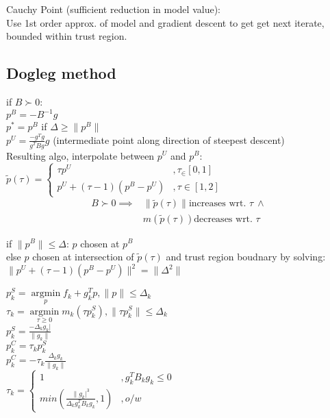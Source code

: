 \documentclass[8pt,letter]{article}
\DeclareMathOperator*{\argmin}{argmin}
\newcommand*{\argminl}{\argmin\limits}
\begin{document}
\begin{multicols*}{2}
  Cauchy Point (sufficient reduction in model value):\\
  Use 1st order approx. of model and gradient descent to get get next iterate, bounded within trust region.\\
  
  \subsection{Dogleg method}
  if $B \succ 0$:\\
  $p^B=-B^{-1}g$\\
  $p^*=p^B$ if $\Delta \geq \|p^B\|$\\
  $p^U=\frac{-g^Tg}{g^TBg}g$ (intermediate point along direction of steepest descent)\\
  Resulting algo, interpolate between $p^U$ and $p^B$:\\
  $\tilde{p}(\tau) =
  \begin{cases}
    \tau p^U &, \tau_\in [0,1]\\
    p^U + (\tau-1)(p^B-p^U) &, \tau \in [1,2]
  \end{cases}
  $
  \begin{align*}
    B \succ 0 \implies & \|\tilde{p}(\tau)\| \text{increases wrt. }\tau\ \land\\
    & m(\tilde{p}(\tau)) \text{decreases wrt. } \tau
  \end{align*}
  
  if $\|p^B\| \leq \Delta$: $p$ chosen at $p^B$\\
  else $p$ chosen at intersection of $\tilde{p}(\tau)$ and trust region boudnary by solving:\\
  $\|p^U+(\tau-1)(p^B-p^U)\|^2 = \|\Delta^2\|$

  $p_k^S=\argminl_p f_k+g_k^Tp, \|p\| \leq \Delta_k$\\
  $\tau_k = \argminl_{\tau\geq0} m_k(\tau p_k^S), \|\tau p_k^S\| \leq \Delta_k$\\
  $p_k^S=\frac{-\Delta_k g_k|}{\|g_k\|}$\\
  $p_k^C=\tau_k p_k^S$\\
  $p_k^C=-\tau_k \frac{\Delta_k g_k}{\|g_k\|}$\\
  $\tau_k=\begin{cases}
    1 &, g_k^T B_k g_k \leq 0\\
    min(\frac{\|g_k|^3}{\Delta_k g_k^T B_k g_k}, 1) &, o/w
  \end{cases}$
  
  \vfill\null


\end{multicols*}
\end{document}
